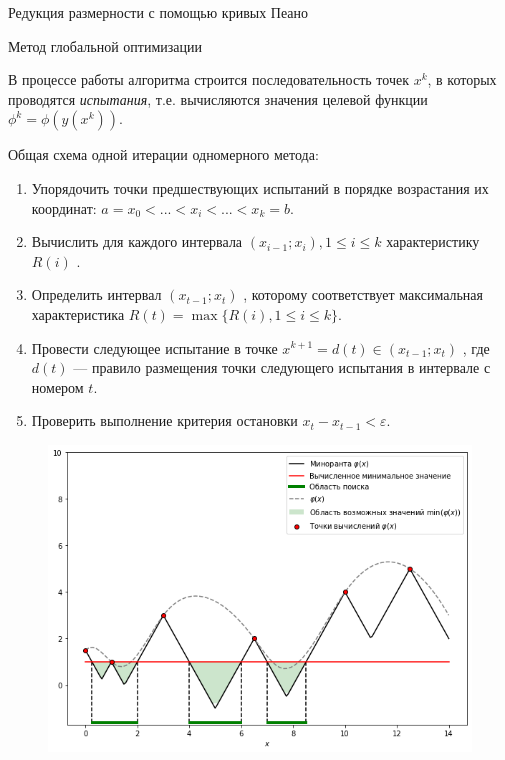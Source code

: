 \documentclass{beamer}
\begin{document}
\begin{frame}[t]
\begin{columns}[t]
\begin{column}[t]{0.48\paperwidth}
\begin{block}{Редукция размерности с помощью кривых Пеано}
\end{block}
\begin{block}{Метод глобальной оптимизации}

В процессе работы алгоритма строится последовательность точек \(x^k\), в которых проводятся \textit{испытания}, т.е. вычисляются значения целевой функции \(\phi^k=\phi(y(x^k))\). 

Общая схема одной итерации одномерного метода:
              \begin{enumerate}
                \justifying
                \item Упорядочить точки предшествующих испытаний в порядке возрастания их координат: \(a=x_{0}<...<x_{i}<...<x_{k}=b\).
                \item Вычислить для каждого интервала \((x_{i-1};x_{i}),1\leq i\leq k\)  характеристику \(R(i)\) .
                \item Определить интервал \((x_{t-1};x_{t})\) , которому соответствует максимальная характеристика \(R(t)=\max\{R(i),1\leq i\leq k\}\).
                \item Провести следующее испытание в точке \(x^{k+1}=d(t)\in (x_{t-1};x_{t})\) , где \(d(t)\)  — правило размещения точки следующего испытания в интервале с номером \(t\).
                \item Проверить выполнение критерия остановки \(x_{t}-x_{t-1}<\varepsilon\).
              \end{enumerate}

 \begin{minipage}[t]{.48\textwidth}
              \begin{figure}
                  \centering
                  \includegraphics[scale=1.27]{images/PlotGS.png}
              \end{figure}
              \end{minipage}
\end{block}
            

\end{column}
\end{columns}
\end{frame}
\end{document}
